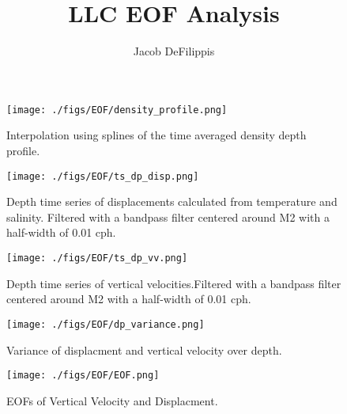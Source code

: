 \documentclass{article}
\begin{document}
\title{LLC EOF Analysis}
\author{Jacob DeFilippis}



\begin{figure}
    \centering
    \texttt{[image: ./figs/EOF/density\_profile.png]}
    \caption{Interpolation using splines of the time averaged density depth profile.}
    \label{depthprof}
\end{figure}

\begin{figure}
    \centering
    \texttt{[image: ./figs/EOF/ts\_dp\_disp.png]}
    \caption{Depth time series of displacements calculated from temperature and salinity. Filtered with a bandpass filter centered around M2 with a half-width of 0.01 cph.}
    \label{ts_d}
\end{figure}

\begin{figure}
    \centering
    \texttt{[image: ./figs/EOF/ts\_dp\_vv.png]}
    \caption{Depth time series of vertical velocities.Filtered with a bandpass filter centered around M2 with a half-width of 0.01 cph. }
    \label{ts_w}
\end{figure}

\begin{figure}
    \centering
    \texttt{[image: ./figs/EOF/dp\_variance.png]}
    \caption{Variance of displacment and vertical velocity over depth.}
\end{figure}

\begin{figure}
    \centering
    \texttt{[image: ./figs/EOF/EOF.png]}
    \caption{EOFs of Vertical Velocity and Displacment.}
\end{figure}
\end{document}
